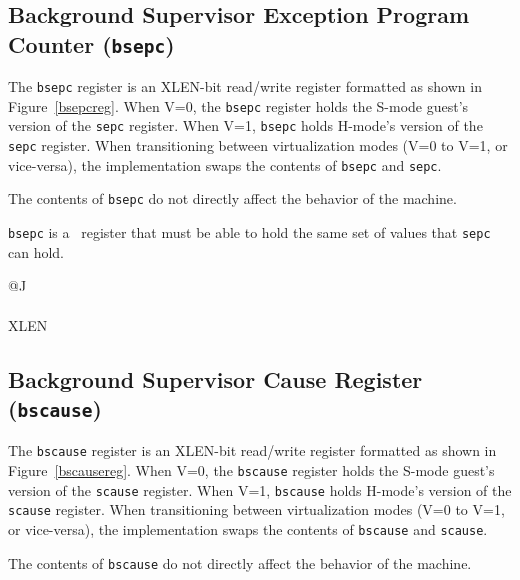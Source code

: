 \subsection{Background Supervisor Exception Program Counter ({\tt bsepc})}

The {\tt bsepc} register is an XLEN-bit read/write register formatted as shown
in Figure~\ref{bsepcreg}.  When V=0, the {\tt bsepc} register holds the
S-mode guest's version of the {\tt sepc} register.  When V=1, {\tt bsepc}
holds H-mode's version of the {\tt sepc} register.  When transitioning between
virtualization modes (V=0 to V=1, or vice-versa), the implementation swaps the
contents of {\tt bsepc} and {\tt sepc}.

The contents of {\tt bsepc} do not directly affect the behavior of
the machine.

{\tt bsepc} is a \warl\ register that must be able to hold the same set of
values that {\tt sepc} can hold.

\begin{figure*}[h!]
{\footnotesize
\begin{center}
\begin{tabular}{@{}J}
 \\
\hline
{} \\
\hline
XLEN \\
\end{tabular}
\end{center}
}
\vspace{-0.1in}
\caption{Background supervisor exception program counter ({\tt bsepc}).}
\label{bsepcreg}
\end{figure*}

\subsection{Background Supervisor Cause Register ({\tt bscause})}

The {\tt bscause} register is an XLEN-bit read/write register formatted as shown
in Figure~\ref{bscausereg}.  When V=0, the {\tt bscause} register holds the
S-mode guest's version of the {\tt scause} register.  When V=1, {\tt bscause}
holds H-mode's version of the {\tt scause} register.  When transitioning between
virtualization modes (V=0 to V=1, or vice-versa), the implementation swaps the
contents of {\tt bscause} and {\tt scause}.

The contents of {\tt bscause} do not directly affect the behavior of
the machine.

